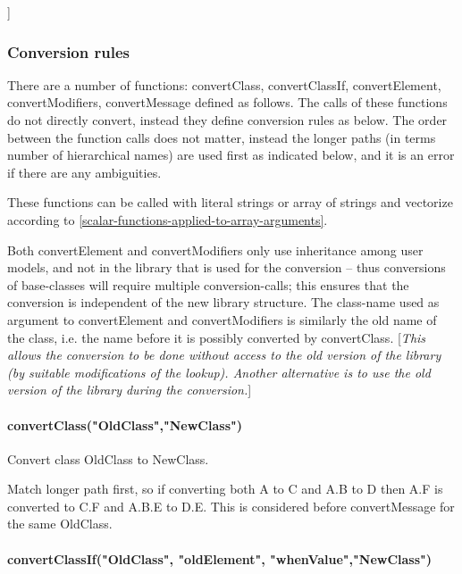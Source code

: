 \documentclass[10pt,a4paper]{report}
\def\doublelabel#1{\label{#1}}
\begin{document}
{]}

\subsubsection{Conversion rules}\doublelabel{conversion-rules}

There are a number of functions: convertClass, convertClassIf,
convertElement, convertModifiers, convertMessage defined as follows. The
calls of these functions do not directly convert, instead they define
conversion rules as below. The order between the function calls does not
matter, instead the longer paths (in terms number of hierarchical names)
are used first as indicated below, and it is an error if there are any
ambiguities.

These functions can be called with literal strings or array of strings
and vectorize according to \ref{scalar-functions-applied-to-array-arguments}.

Both convertElement and convertModifiers only use inheritance among user
models, and not in the library that is used for the conversion -- thus
conversions of base-classes will require multiple conversion-calls; this
ensures that the conversion is independent of the new library structure.
The class-name used as argument to convertElement and convertModifiers
is similarly the old name of the class, i.e. the name before it is
possibly converted by convertClass. {[}\emph{This allows the conversion
to be done without access to the old version of the library (by suitable
modifications of the lookup). Another alternative is to use the old
version of the library during the conversion.}{]}

\paragraph*{convertClass("OldClass","NewClass")}\doublelabel{convertclassoldclassnewclass}

Convert class OldClass to NewClass.

Match longer path first, so if converting both A to C and A.B to D then
A.F is converted to C.F and A.B.E to D.E. This is considered before
convertMessage for the same OldClass.

\paragraph*{convertClassIf("OldClass", "oldElement", "whenValue","NewClass")}\doublelabel{convertclassifoldclass-oldelement-whenvalue-newclass}
\end{document}

